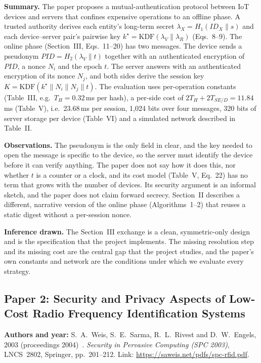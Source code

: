 \textbf{Summary.} The paper proposes a mutual-authentication protocol between IoT devices and servers that confines expensive operations to an offline phase. A trusted authority derives each entity's long-term secret $\lambda_X=H_1(ID_X\|s)$ and each device--server pair's pairwise key $k^\star=\mathrm{KDF}(\lambda_V\|\lambda_R)$ (Eqs.~8--9). The online phase (Section~III, Eqs.~11--20) has two messages. The device sends a pseudonym $PID=H_2(\lambda_V\|t)$ together with an authenticated encryption of $PID$, a nonce $N_i$ and the epoch $t$. The server answers with an authenticated encryption of its nonce $N_j$, and both sides derive the session key $K=\mathrm{KDF}(k^\star\|N_i\|N_j\|t)$. The evaluation uses per-operation constants (Table~III, e.g.\ $T_H=0.32$\,ms per hash), a per-side cost of $2T_H+2T_{SE/D}=11.84$\,ms (Table~V), i.e.\ 23.68\,ms per session, 1,024 bits over four messages, 320 bits of server storage per device (Table~VI) and a simulated network described in Table~II.

\textbf{Observations.} The pseudonym is the only field in clear, and the key needed to open the message is specific to the device, so the server must identify the device before it can verify anything. The paper does not say how it does this, nor whether $t$ is a counter or a clock, and its cost model (Table~V, Eq.~22) has no term that grows with the number of devices. Its security argument is an informal sketch, and the paper does not claim forward secrecy. Section~II describes a different, narrative version of the online phase (Algorithms~1--2) that reuses a static digest without a per-session nonce.

\textbf{Inference drawn.} The Section~III exchange is a clean, symmetric-only design and is the specification that the project implements. The missing resolution step and its missing cost are the central gap that the project studies, and the paper's own constants and network are the conditions under which we evaluate every strategy.

\subsection*{Paper 2: Security and Privacy Aspects of Low-Cost Radio Frequency Identification Systems}
\textbf{Authors and year:} S.~A.~Weis, S.~E.~Sarma, R.~L.~Rivest and D.~W.~Engels, 2003 (proceedings 2004)~\cite{weis}. \emph{Security in Pervasive Computing (SPC 2003)}, LNCS~2802, Springer, pp.~201--212. Link: \url{https://saweis.net/pdfs/spc-rfid.pdf}.

